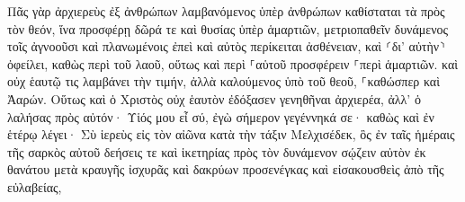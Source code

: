 \documentclass{openreader}
\begin{document}
Πᾶς γὰρ ἀρχιερεὺς ἐξ ἀνθρώπων λαμβανόμενος ὑπὲρ ἀνθρώπων καθίσταται τὰ πρὸς τὸν θεόν, ἵνα προσφέρῃ δῶρά τε καὶ θυσίας ὑπὲρ ἁμαρτιῶν, 
μετριοπαθεῖν δυνάμενος τοῖς ἀγνοοῦσι καὶ πλανωμένοις ἐπεὶ καὶ αὐτὸς περίκειται ἀσθένειαν, 
καὶ ⸂δι’ αὐτὴν⸃ ὀφείλει, καθὼς περὶ τοῦ λαοῦ, οὕτως καὶ περὶ ⸀αὑτοῦ προσφέρειν ⸀περὶ ἁμαρτιῶν. 
καὶ οὐχ ἑαυτῷ τις λαμβάνει τὴν τιμήν, ἀλλὰ καλούμενος ὑπὸ τοῦ θεοῦ, ⸀καθώσπερ καὶ Ἀαρών. 
Οὕτως καὶ ὁ Χριστὸς οὐχ ἑαυτὸν ἐδόξασεν γενηθῆναι ἀρχιερέα, ἀλλ’ ὁ λαλήσας πρὸς αὐτόν· Υἱός μου εἶ σύ, ἐγὼ σήμερον γεγέννηκά σε· 
καθὼς καὶ ἐν ἑτέρῳ λέγει· Σὺ ἱερεὺς εἰς τὸν αἰῶνα κατὰ τὴν τάξιν Μελχισέδεκ, 
ὃς ἐν ταῖς ἡμέραις τῆς σαρκὸς αὐτοῦ δεήσεις τε καὶ ἱκετηρίας πρὸς τὸν δυνάμενον σῴζειν αὐτὸν ἐκ θανάτου μετὰ κραυγῆς ἰσχυρᾶς καὶ δακρύων προσενέγκας καὶ εἰσακουσθεὶς ἀπὸ τῆς εὐλαβείας, 
\end{document}
